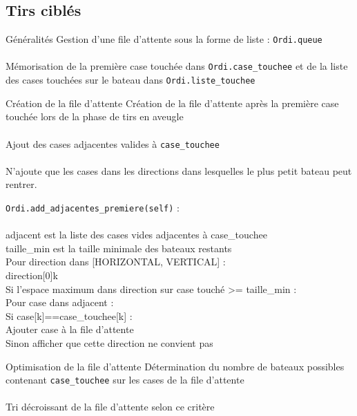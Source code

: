 \subsection{Tirs ciblés}
\begin{frame}{Généralités}
Gestion d'une file d'attente sous la forme de liste : \texttt{Ordi.queue}\\~\\  \pause
Mémorisation de la première case touchée dans \texttt{Ordi.case\_touchee} et de la liste des cases touchées sur le bateau dans \texttt{Ordi.liste\_touchee}
\end{frame}

\begin{frame}{Création de la file d'attente}
Création de la file d'attente après la première case touchée lors de la phase de tirs en aveugle\\~\\  \pause
Ajout des cases adjacentes valides à \texttt{case\_touchee}\\~\\  \pause
N'ajoute que les cases dans les directions dans lesquelles le plus petit bateau peut rentrer.
\end{frame}

{
\begin{frame}
\texttt{Ordi.add\_adjacentes\_premiere(self)} :\\~\\
adjacent est la liste des cases vides adjacentes à case\_touchee\\
taille\_min est la taille minimale des bateaux restants\\
Pour direction dans [HORIZONTAL, VERTICAL] :\\
direction[0]\sto k\\
Si l'espace maximum dans direction sur case touché >= taille\_min :\\
Pour case dans adjacent :\\
Si case[k]==case\_touchee[k] :\\
Ajouter case à la file d'attente\\
Sinon afficher que cette direction ne convient pas\\
\end{frame}
}



\begin{frame}{Optimisation de la file d'attente}
Détermination du nombre de bateaux possibles contenant \texttt{case\_touchee} sur les cases de la file d'attente\\~\\
Tri décroissant de la file d'attente selon ce critère
\end{frame}

